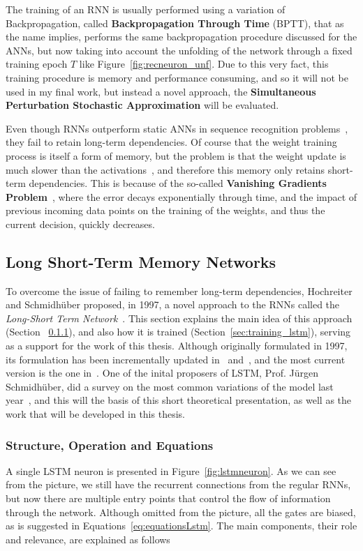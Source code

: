 The training of an RNN is usually performed using a variation of Backpropagation, called \textbf{Backpropagation Through Time} (BPTT), that as the name implies, performs the same backpropagation procedure discussed for the ANNs, but now taking into account the unfolding of the network through a fixed training epoch $T$ like Figure~\ref{fig:recneuron_unf}. Due to this very fact, this training procedure is memory and performance consuming, and so it will not be used in my final work, but instead a novel approach, the \textbf{Simultaneous Perturbation Stochastic Approximation} will be evaluated. 

Even though RNNs outperform static ANNs in sequence recognition problems~\cite{Bengio1991}, they fail to retain long-term dependencies. Of course that the weight training process is itself a form of memory, but the problem is that the weight update is much slower than the activations~\cite{Yoshua01}, and therefore this memory only retains short-term dependencies. This is because of the so-called \textbf{Vanishing Gradients Problem}~\cite{Yoshua94,Yoshua01}, where the error decays exponentially through time, and the impact of previous incoming data points on the training of the weights, and thus the current decision, quickly decreases. 


\subsection{Long Short-Term Memory Networks}\label{sec:theorBack_lstm}
To overcome the issue of failing to remember long-term dependencies, Hochreiter and Schmidhüber proposed, in 1997, a novel approach to the RNNs called the \textit{Long-Short Term Network}~\cite{Hoch97}. This section explains the main idea of this approach (Section ~\ref{sec:struct_lstm}), and also how it is trained (Section~\ref{sec:training_lstm}), serving as a support for the work of this thesis.
Although originally formulated in 1997, its formulation has been incrementally updated in~\cite{Gers00} and~\cite{Gers2000}, and the most current version is the one in~\cite{Graves05}. One of the inital proposers of LSTM, Prof. Jürgen Schmidhüber, did a survey on the most common variations of the model last year~\cite{Greff15}, and this will the basis of this short theoretical presentation, as well as the work that will be developed in this thesis. 

\subsubsection{Structure, Operation and Equations}\label{sec:struct_lstm}
A single LSTM neuron is presented in Figure~\ref{fig:lstmneuron}. As we can see from the picture, we still have the recurrent connections from the regular RNNs, but now there are multiple entry points that control the flow of information through the network. Although omitted from the picture, all the gates are biased, as is suggested in Equations~\ref{eq:equationsLstm}. The main components, their role and relevance, are explained as follows

